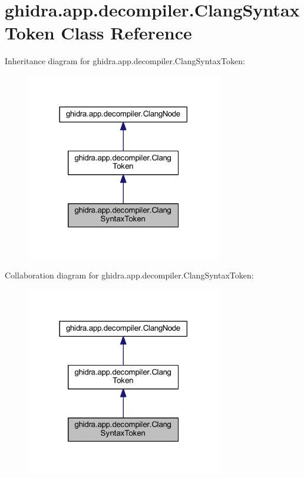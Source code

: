 \hypertarget{classghidra_1_1app_1_1decompiler_1_1_clang_syntax_token}{}\section{ghidra.\+app.\+decompiler.\+Clang\+Syntax\+Token Class Reference}
\label{classghidra_1_1app_1_1decompiler_1_1_clang_syntax_token}


Inheritance diagram for ghidra.\+app.\+decompiler.\+Clang\+Syntax\+Token\+:
\nopagebreak
\begin{figure}[H]
\begin{center}
\leavevmode
\includegraphics[width=242pt]{classghidra_1_1app_1_1decompiler_1_1_clang_syntax_token__inherit__graph}
\end{center}
\end{figure}


Collaboration diagram for ghidra.\+app.\+decompiler.\+Clang\+Syntax\+Token\+:
\nopagebreak
\begin{figure}[H]
\begin{center}
\leavevmode
\includegraphics[width=242pt]{classghidra_1_1app_1_1decompiler_1_1_clang_syntax_token__coll__graph}
\end{center}
\end{figure}
